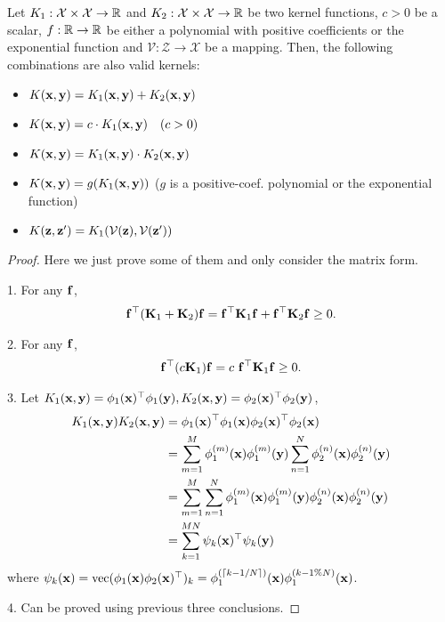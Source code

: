\begin{property}
Let $K_1: \mathcal{X} \times \mathcal{X} \to \mathbb{R}$
and $K_2: \mathcal{X} \times \mathcal{X} \to \mathbb{R}$
be two kernel functions,
$c > 0$ be a scalar,
$f: \mathbb{R} \to \mathbb{R}$
be either a polynomial with positive coefficients or the
exponential function and
$\mathcal{V} : \mathcal{Z} \to \mathcal{X}$ be a mapping.
Then, the following combinations are also valid kernels:
\begin{itemize}
	\item $K(\mathbf{x}, \mathbf{y}) = K_1(\mathbf{x}, \mathbf{y}) + K_2(\mathbf{x}, \mathbf{y})$
	\item $K(\mathbf{x}, \mathbf{y}) = c \cdot K_1(\mathbf{x}, \mathbf{y}) \quad (c > 0)$
	\item $K(\mathbf{x}, \mathbf{y}) = K_1(\mathbf{x}, \mathbf{y}) \cdot K_2(\mathbf{x}, \mathbf{y})$
	\item $K(\mathbf{x}, \mathbf{y}) = g(K_1(\mathbf{x}, \mathbf{y}))$ ($g$ is a positive-coef. polynomial  or the exponential function)
	\item $K(\mathbf{z}, \mathbf{z}') = K_1(\mathcal{V}(\mathbf{z}), \mathcal{V}(\mathbf{z}'))$
\end{itemize}
\end{property} 
\begin{proof} Here we just prove some of them and only consider the matrix form. 

1. For any $\mathbf{f}$,
\begin{align}
\mathbf{f}^\top (\mathbf{K}_1 + \mathbf{K}_2)  \mathbf{f} = \mathbf{f}^\top \mathbf{K}_1  \mathbf{f} + \mathbf{f}^\top \mathbf{K}_2 \mathbf{f} \geq 0.
\end{align}

2. For any $\mathbf{f}$,
\begin{align}
\mathbf{f}^\top (c \mathbf{K}_1)  \mathbf{f} = c \ \mathbf{f}^\top \mathbf{K}_1  \mathbf{f} \geq 0.
\end{align}

3. Let $K_1(\mathbf{x}, \mathbf{y}) = \phi_1(\mathbf{x})^\top \phi_1(\mathbf{y}), K_2(\mathbf{x}, \mathbf{y}) = \phi_2(\mathbf{x})^\top \phi_2(\mathbf{y})$,
\begin{align}
	K_1(\mathbf{x}, \mathbf{y}) K_2(\mathbf{x}, \mathbf{y}) & = \phi_1(\mathbf{x})^\top \phi_1(\mathbf{x}) \phi_2(\mathbf{x})^\top \phi_2(\mathbf{x})\\
	& = \sum_{m = 1}^M \phi_1^{(m)}(\mathbf{x})\phi_1^{(m)}(\mathbf{y}) \sum_{n = 1}^N \phi_2^{(n)}(\mathbf{x})\phi_2^{(n)}(\mathbf{y}) \\
	& = \sum_{m = 1}^M \sum_{n = 1}^N \phi_1^{(m)}(\mathbf{x})\phi_1^{(m)}(\mathbf{y}) \phi_2^{(n)}(\mathbf{x})\phi_2^{(n)}(\mathbf{y}) \\
	& = \sum_{k = 1}^{MN} \psi_k(\mathbf{x})^\top \psi_k(\mathbf{y}) 
\end{align}
where $\psi_k(\mathbf{x}) = \mathrm{vec}(\phi_1(\mathbf{x}) \phi_2(\mathbf{x})^\top)_k = \phi_1^{(\lceil k - 1 / N\rceil)}(\mathbf{x}) \phi_1^{(k - 1 \% N)}(\mathbf{x})$. 

4. Can be proved using previous three conclusions.
\end{proof}

